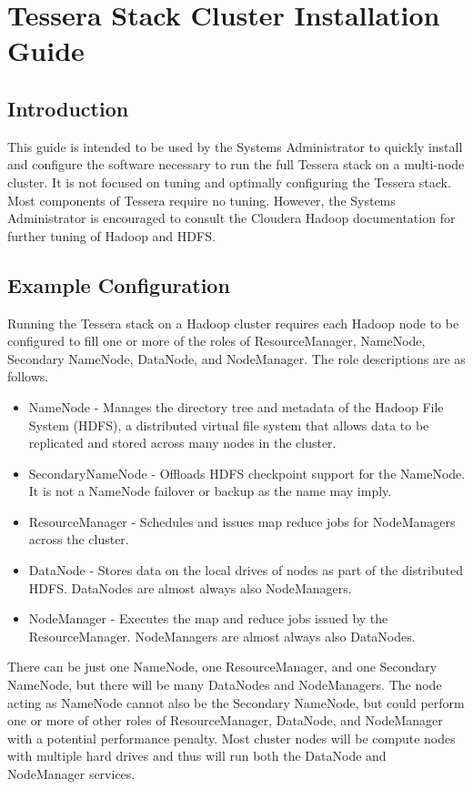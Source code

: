 \section{Tessera Stack Cluster Installation Guide}
\subsection{Introduction}
This guide is intended to be used by the Systems Administrator to quickly
install and configure the software necessary to run the full Tessera
stack on a multi-node cluster.  It is not focused on tuning and optimally
configuring the Tessera stack.  Most components of Tessera require no
tuning.  However, the Systems Administrator is encouraged to consult the
Cloudera Hadoop documentation for further tuning of Hadoop and HDFS.

\subsection{Example Configuration}
Running the Tessera stack on a Hadoop cluster requires each Hadoop node
to be configured to fill one or more of the roles of ResourceManager,
NameNode, Secondary NameNode, DataNode, and NodeManager. The role
descriptions are as follows.

\begin{itemize}
\item NameNode - Manages the directory tree and metadata of the Hadoop File System (HDFS), a distributed virtual file system that allows data to be replicated and stored across many nodes in the cluster. 
\item SecondaryNameNode - Offloads HDFS checkpoint support for the NameNode.  It is not a NameNode failover or backup as the name may imply.
\item ResourceManager - Schedules and issues map reduce jobs for NodeManagers across the cluster.
\item DataNode - Stores data on the local drives of nodes as part of the distributed HDFS.  DataNodes are almost always also NodeManagers.
\item NodeManager - Executes the map and reduce jobs issued by the ResourceManager. NodeManagers are almost always also DataNodes.
\end{itemize}

There can be just one NameNode, one ResourceManager, and one Secondary
NameNode, but there will be many DataNodes and NodeManagers.  The node
acting as NameNode cannot also be the Secondary NameNode, but could
perform one or more of other roles of ResourceManager, DataNode, and
NodeManager with a potential  performance penalty.  Most cluster nodes
will be compute nodes with multiple hard drives and thus will run both
the DataNode and NodeManager services.

